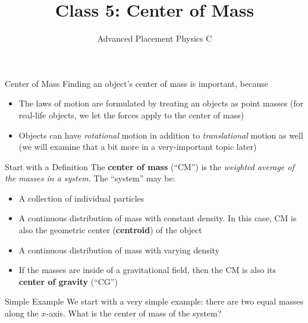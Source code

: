 \documentclass[12pt,compress,aspectratio=169]{beamer}
\title{Class 5: Center of Mass}
\subtitle{Advanced Placement Physics C}
\begin{document}
\begin{frame}
  \maketitle
\end{frame}



\begin{frame}{Center of Mass}
  Finding an object's center of mass is important, because
  \begin{itemize}
  \item The laws of motion are formulated by treating an objects as point
    masses (for real-life objects, we let the forces apply to the center of
    mass)
  \item Objects can have \emph{rotational} motion in addition to
    \emph{translational} motion as well (we will examine that a bit more in a
    very-important topic later)
  \end{itemize}
\end{frame}



\begin{frame}{Start with a Definition}
  The \textbf{center of mass} (``CM'') is the \emph{weighted average of the
    masses in a system.} The ``system'' may be:
  \begin{itemize}
  \item A collection of individual particles
  \item A continuous distribution of mass with constant density. In this case,
    CM is also the geometric center (\textbf{centroid}) of the object
  \item A continuous distribution of mass with varying density
  \item If the masses are inside of a gravitational field, then the CM is also
    its \textbf{center of gravity} (``CG'')
  \end{itemize}
\end{frame}



\begin{frame}{Simple Example}
  We start with a very simple example: there are two equal masses along the
  $x$-axis. What is the center of mass of the system?
    
  \vspace{.25in}
  \begin{center}
  \end{center}
  \vspace{.2in}

\end{frame}
\end{document}
